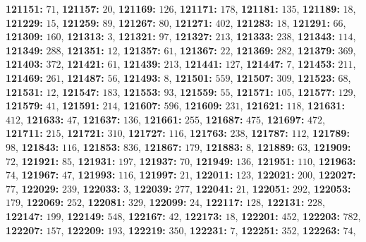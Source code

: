 \textsf{\bfseries 121151:} $71$, \textsf{\bfseries 121157:} $20$, \textsf{\bfseries 121169:} $126$, \textsf{\bfseries 121171:} $178$, \textsf{\bfseries 121181:} $135$, \textsf{\bfseries 121189:} $18$, \textsf{\bfseries 121229:} $15$, \textsf{\bfseries 121259:} $89$, \textsf{\bfseries 121267:} $80$, \textsf{\bfseries 121271:} $402$, \textsf{\bfseries 121283:} $18$, \textsf{\bfseries 121291:} $66$, \textsf{\bfseries 121309:} $160$, \textsf{\bfseries 121313:} $3$, \textsf{\bfseries 121321:} $97$, \textsf{\bfseries 121327:} $213$, \textsf{\bfseries 121333:} $238$, \textsf{\bfseries 121343:} $114$, \textsf{\bfseries 121349:} $288$, \textsf{\bfseries 121351:} $12$, \textsf{\bfseries 121357:} $61$, \textsf{\bfseries 121367:} $22$, \textsf{\bfseries 121369:} $282$, \textsf{\bfseries 121379:} $369$, \textsf{\bfseries 121403:} $372$, \textsf{\bfseries 121421:} $61$, \textsf{\bfseries 121439:} $213$, \textsf{\bfseries 121441:} $127$, \textsf{\bfseries 121447:} $7$, \textsf{\bfseries 121453:} $211$, \textsf{\bfseries 121469:} $261$, \textsf{\bfseries 121487:} $56$, \textsf{\bfseries 121493:} $8$, \textsf{\bfseries 121501:} $559$, \textsf{\bfseries 121507:} $309$, \textsf{\bfseries 121523:} $68$, \textsf{\bfseries 121531:} $12$, \textsf{\bfseries 121547:} $183$, \textsf{\bfseries 121553:} $93$, \textsf{\bfseries 121559:} $55$, \textsf{\bfseries 121571:} $105$, \textsf{\bfseries 121577:} $129$, \textsf{\bfseries 121579:} $41$, \textsf{\bfseries 121591:} $214$, \textsf{\bfseries 121607:} $596$, \textsf{\bfseries 121609:} $231$, \textsf{\bfseries 121621:} $118$, \textsf{\bfseries 121631:} $412$, \textsf{\bfseries 121633:} $47$, \textsf{\bfseries 121637:} $136$, \textsf{\bfseries 121661:} $255$, \textsf{\bfseries 121687:} $475$, \textsf{\bfseries 121697:} $472$, \textsf{\bfseries 121711:} $215$, \textsf{\bfseries 121721:} $310$, \textsf{\bfseries 121727:} $116$, \textsf{\bfseries 121763:} $238$, \textsf{\bfseries 121787:} $112$, \textsf{\bfseries 121789:} $98$, \textsf{\bfseries 121843:} $116$, \textsf{\bfseries 121853:} $836$, \textsf{\bfseries 121867:} $179$, \textsf{\bfseries 121883:} $8$, \textsf{\bfseries 121889:} $63$, \textsf{\bfseries 121909:} $72$, \textsf{\bfseries 121921:} $85$, \textsf{\bfseries 121931:} $197$, \textsf{\bfseries 121937:} $70$, \textsf{\bfseries 121949:} $136$, \textsf{\bfseries 121951:} $110$, \textsf{\bfseries 121963:} $74$, \textsf{\bfseries 121967:} $47$, \textsf{\bfseries 121993:} $116$, \textsf{\bfseries 121997:} $21$, \textsf{\bfseries 122011:} $123$, \textsf{\bfseries 122021:} $200$, \textsf{\bfseries 122027:} $77$, \textsf{\bfseries 122029:} $239$, \textsf{\bfseries 122033:} $3$, \textsf{\bfseries 122039:} $277$, \textsf{\bfseries 122041:} $21$, \textsf{\bfseries 122051:} $292$, \textsf{\bfseries 122053:} $179$, \textsf{\bfseries 122069:} $252$, \textsf{\bfseries 122081:} $329$, \textsf{\bfseries 122099:} $24$, \textsf{\bfseries 122117:} $128$, \textsf{\bfseries 122131:} $228$, \textsf{\bfseries 122147:} $199$, \textsf{\bfseries 122149:} $548$, \textsf{\bfseries 122167:} $42$, \textsf{\bfseries 122173:} $18$, \textsf{\bfseries 122201:} $452$, \textsf{\bfseries 122203:} $782$, \textsf{\bfseries 122207:} $157$, \textsf{\bfseries 122209:} $193$, \textsf{\bfseries 122219:} $350$, \textsf{\bfseries 122231:} $7$, \textsf{\bfseries 122251:} $352$, \textsf{\bfseries 122263:} $74$, 

